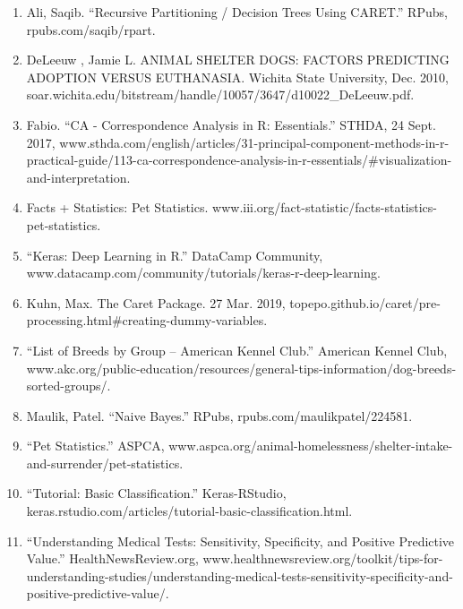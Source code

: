 \documentclass[12pt]{article} %
\begin{document}
\begin{enumerate}
\item Ali, Saqib. “Recursive Partitioning / Decision Trees Using CARET.” RPubs, rpubs.com/saqib/rpart.

\item DeLeeuw , Jamie L. ANIMAL SHELTER DOGS: FACTORS PREDICTING ADOPTION VERSUS EUTHANASIA. Wichita State University, Dec. 2010,
soar.wichita.edu/bitstream/handle/10057/3647/d10022\_DeLeeuw.pdf.

\item Fabio. “CA - Correspondence Analysis in R: Essentials.” STHDA, 24 Sept. 2017, www.sthda.com/english/articles/31-principal-component-methods-in-r-practical-guide/113-ca-correspondence-analysis-in-r-essentials/\#visualization-and-interpretation.

\item Facts + Statistics: Pet Statistics. www.iii.org/fact-statistic/facts-statistics-pet-statistics.

\item “Keras: Deep Learning in R.” DataCamp Community, www.datacamp.com/community/tutorials/keras-r-deep-learning.

\item Kuhn, Max. The Caret Package. 27 Mar. 2019, topepo.github.io/caret/pre-processing.html\#creating-dummy-variables.

\item “List of Breeds by Group – American Kennel Club.” American Kennel Club, www.akc.org/public-education/resources/general-tips-information/dog-breeds-sorted-groups/.

\item Maulik, Patel. “Naive Bayes.” RPubs, rpubs.com/maulikpatel/224581.

\item “Pet Statistics.” ASPCA, www.aspca.org/animal-homelessness/shelter-intake-and-surrender/pet-statistics.

\item “Tutorial: Basic Classification.” Keras-RStudio, keras.rstudio.com/articles/tutorial-basic-classification.html.

\item “Understanding Medical Tests: Sensitivity, Specificity, and Positive Predictive Value.” HealthNewsReview.org, www.healthnewsreview.org/toolkit/tips-for-understanding-studies/understanding-medical-tests-sensitivity-specificity-and-positive-predictive-value/.

\end{enumerate}



\vfill
\hrulefill
\begin{center}
\end{center}
\end{document}

